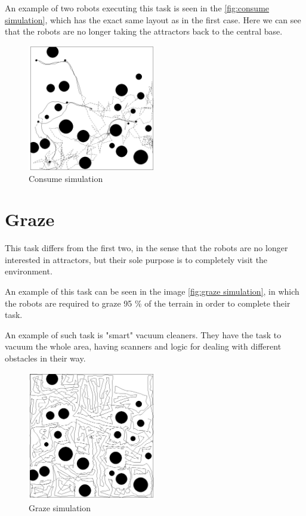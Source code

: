 \documentclass[12pt]{report}
\begin{document}
An example of two robots executing this task is seen in the \autoref{fig:consume simulation}, which has the exact same layout as in the first case. Here we can see that the robots are no longer taking the attractors back to the central base.



\begin{figure}[h]
\centering
\includegraphics[width=0.5\textwidth]{"2 consume simulation"}
\caption{Consume simulation}
\label{fig:consume simulation}
\end{figure}







\section{Graze}

This task differs from the first two, in the sense that the robots are no longer interested in attractors, but their sole purpose is to completely visit the environment.

An example of this task can be seen in the image \autoref{fig:graze simulation}, in which the robots are required to graze 95 \% of the terrain in order to complete their task.

An example of such task is "smart" vacuum cleaners. They have the task to vacuum the whole area, having scanners and logic for dealing with different obstacles in their way.

\begin{figure}[h!]
\centering
\includegraphics[width=0.5\textwidth]{"3 graze simulation"}
\caption{Graze simulation}
\label{fig:graze simulation}
\end{figure}
\end{document}
